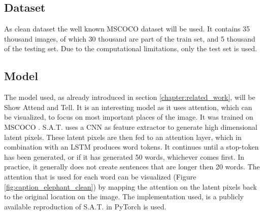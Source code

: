 
\subsection{Dataset}
As clean dataset the well known MSCOCO \cite{lin2015microsoft} dataset will be used. It contains 35 thousand images, of which 30 thousand are part of the train set, and 5 thousand of the testing set. Due to the computational limitations, only the test set is used.

\subsection{Model}
The model used, as already introduced in section \ref{chapter:related_work}, will be Show Attend and Tell. It is an interesting model as it uses attention, which can be visualized, to focus on most important places of the image. It was trained on MSCOCO \cite{lin2015microsoft}. S.A.T. uses a CNN as feature extractor to generate high dimensional latent pixels. These latent pixels are then fed to an attention layer, which in combination with an LSTM produces word tokens. It continues until a stop-token has been generated, or if it has generated 50 words, whichever comes first. In practice, it generally does not create sentences that are longer then 20 words. The attention that is used for each word can be visualized (Figure \ref{fig:caption_elephant_clean}) by mapping the attention on the latent pixels back to the original location on the image. The implementation used, is a publicly available reproduction of S.A.T. in PyTorch \cite{NEURIPS2019_9015} is used. \cite{sgrvinod}

